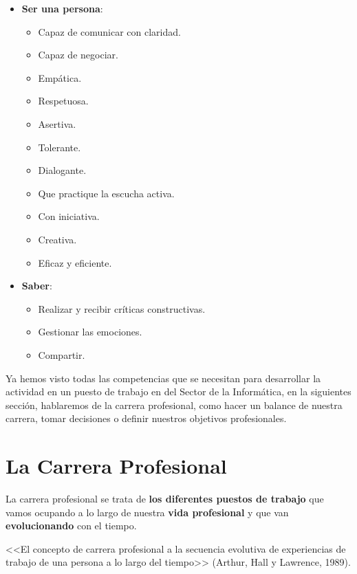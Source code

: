 \begin{itemize}
        \item \textbf{Ser una persona}:
        \begin{itemize}
            \item Capaz de comunicar con claridad.
            \item Capaz de negociar.
            \item Empática.
            \item Respetuosa.
            \item Asertiva.
            \item Tolerante.
            \item Dialogante.
            \item Que practique la escucha activa.
            \item Con iniciativa.
            \item Creativa.
            \item Eficaz y eficiente.
        \end{itemize}
        \item \textbf{Saber}:
        \begin{itemize}
            \item Realizar y recibir críticas constructivas.
            \item Gestionar las emociones.
            \item Compartir.
        \end{itemize}
\end{itemize}

Ya hemos visto todas las competencias que se necesitan para desarrollar la actividad en un puesto de trabajo en del Sector de la Informática, en la siguientes sección, hablaremos de la carrera profesional, como hacer un balance de nuestra carrera, tomar decisiones o definir nuestros objetivos profesionales.

\section{La Carrera Profesional}
La carrera profesional se trata de \textbf{los diferentes puestos de trabajo} que vamos ocupando a lo largo de nuestra \textbf{vida profesional} y que van \textbf{evolucionando} con el tiempo.

<<El concepto de carrera profesional a la secuencia evolutiva de experiencias de trabajo de una persona a lo largo del tiempo>> (Arthur, Hall y Lawrence, 1989).

